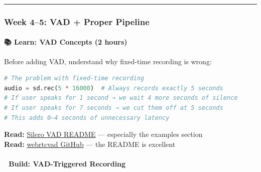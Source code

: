 \documentclass[
  11pt,
]{article}
\begin{document}
\begin{center}\rule{0.5\linewidth}{0.5pt}\end{center}

\hypertarget{week-45-vad-proper-pipeline}{%
\subsubsection{Week 4--5: VAD + Proper
Pipeline}\label{week-45-vad-proper-pipeline}}

\hypertarget{learn-vad-concepts-2-hours}{%
\paragraph{📚 Learn: VAD Concepts (2
hours)}\label{learn-vad-concepts-2-hours}}

Before adding VAD, understand why fixed-time recording is wrong:

\begin{lstlisting}[language=Python]
# The problem with fixed-time recording
audio = sd.rec(5 * 16000)  # Always records exactly 5 seconds
# If user speaks for 1 second → we wait 4 more seconds of silence
# If user speaks for 7 seconds → we cut them off at 5 seconds
# This adds 0–4 seconds of unnecessary latency
\end{lstlisting}

\textbf{Read:} \href{https://github.com/snakers4/silero-vad}{Silero VAD
README} --- especially the examples section\\
\textbf{Read:} \href{https://github.com/wiseman/py-webrtcvad}{webrtcvad
GitHub} --- the README is excellent

\hypertarget{build-vad-triggered-recording}{%
\paragraph{🔨 Build: VAD-Triggered
Recording}\label{build-vad-triggered-recording}}
\end{document}
